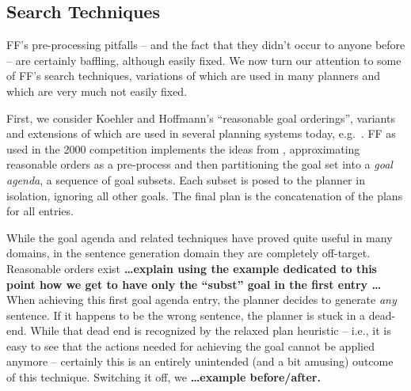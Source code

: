 \subsection{Search Techniques}
\label{sec:crisp-ff:preprocess:heuristics}





FF's pre-processing pitfalls -- and the fact that they didn't occur to
anyone before -- are certainly baffling, although easily fixed. We now
turn our attention to some of FF's search techniques, variations of
which are used in many planners and which are very much not easily
fixed.




First, we consider Koehler and Hoffmann's
 ``reasonable goal orderings'',
variants and extensions of which are used in several planning systems
today, e.g.\ \cite{hoffmann:etal:jair-04,richter:etal:aaai-08}. FF as
used in the 2000 competition implements the ideas from
\cite{koehler:hoffmann:jair-00}, approximating reasonable orders as a
pre-process and then partitioning the goal set into a {\em goal
  agenda}, a sequence of goal subsets. Each subset is posed to the
planner in isolation, ignoring all other goals. The final plan is the
concatenation of the plans for all entries.


While the goal agenda and related techniques have proved quite useful
in many domains, in the sentence generation domain they are completely
off-target. Reasonable orders exist {\bf \dots explain using the
  example dedicated to this point how we get to have only the
  ``subst'' goal in the first entry \dots} When achieving this first
goal agenda entry, the planner decides to generate {\em any}
sentence. If it happens to be the wrong sentence, the planner is stuck
in a dead-end. While that dead end is recognized by the relaxed plan
heuristic -- i.e., it is easy to see that the actions needed for
achieving the goal cannot be applied anymore -- certainly this is an
entirely unintended (and a bit amusing) outcome of this
technique. Switching it off, we {\bf \dots example before/after.}

